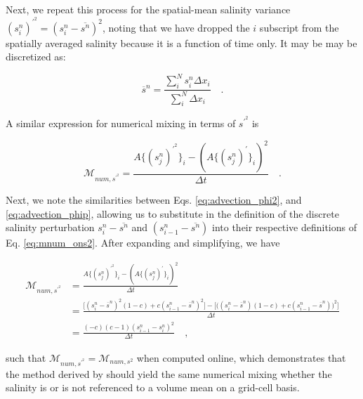\documentclass[draft]{agujournal2019}
\begin{document}
Next, we repeat this process for the spatial-mean salinity variance $(s_i^n)^{\prime^2} = (s_i^n-\overline{s^n})^2$, noting that we have dropped the $i$ subscript from the spatially averaged salinity because it is a function of time only. It may be may be discretized as:
\begin{linenomath*}
\begin{equation}
    \overline{s}^n = \frac{\sum_i^N s_i^n \Delta x_i}{\sum_i^N \Delta x_i} \quad .
\end{equation}
\end{linenomath*}
A similar expression for numerical mixing in terms of $s^{\prime^2}$ is
\begin{linenomath*}
\begin{equation} \label{Eq:mnum_phiprime2}
    \mathcal{M}_{num, s^{\prime^2}} = \frac{A\{(s_j^n)^{\prime^2} \}_i-(A\{(s_j^n)^\prime\}_i)^2}{\Delta t} \quad .
\end{equation}
\end{linenomath*}
Next, we note the similarities between Eqs. \ref{eq:advection_phi2}, and \ref{eq:advection_phip}, allowing us to substitute in the definition of the discrete salinity perturbation $s_i^n-\overline{s^n}$ and $(s_{i-1}^n-\overline{s^n})$ into their respective definitions of Eq. \ref{eq:mnum_ons2}. After expanding and simplifying, we have
\begin{linenomath*}
\begin{equation}
    \begin{split}
    \mathcal{M}_{num, s^{\prime^2}} & = \frac{A\{(s_j^n)^{\prime^2} \}_i-(A\{(s_j^n)^\prime\}_i)^2}{\Delta t} \\
    &= \frac{\bigg[(s_i^n-\overline{s}^n)^2(1-c)+c(s_{i-1}^n-\overline{s}^n)^2 \bigg] -  \bigg[\bigg((s_i^n-\overline{s}^n)(1-c)+c(s_{i-1}^n-\overline{s}^n) \bigg)^2 \bigg]}{\Delta t} \\
    & =\frac{(-c)(c-1)(s_{i-1}^n-s_i^n)^2}{\Delta t} \quad ,
    \end{split}
\end{equation}
\end{linenomath*}
such that $\mathcal{M}_{num, s^{\prime^2}} = \mathcal{M}_{num, s^2}$ when computed online, which demonstrates that the method derived by  should yield the same numerical mixing whether the salinity is or is not referenced to a volume mean on a grid-cell basis.
%
%
%
%
\end{document}
